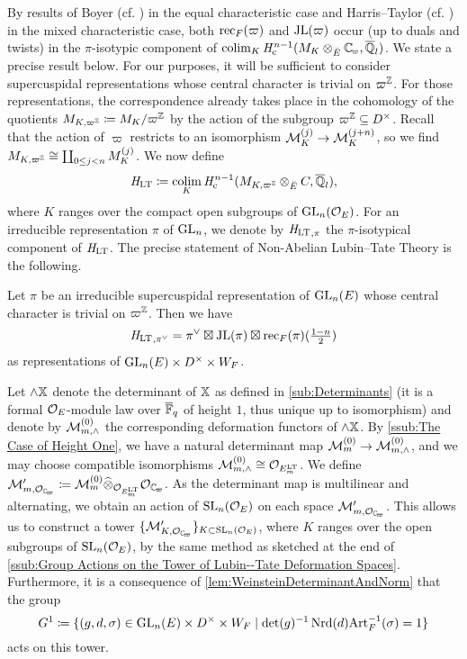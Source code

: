 \documentclass[../main.tex]{subfiles}
\begin{document}
By results of Boyer (cf. \cite{boyer1999mauvaise})
in the equal characteristic case and Harris--Taylor (cf. \cite{HTShimura}) in the 
mixed characteristic case, both $\mathrm{rec}_F(\varpi)$ and $\mathrm{JL}(\varpi)$ occur
(up to duals and twists) in the $\pi$-isotypic component of 
$\colim_K \hHc^{n-1} (M_{K} \otimes_{\br E} \Cp, \bar \Q_l)$. We state a
precise result below.
For our purposes, it will be sufficient to consider supercuspidal representations
whose central character is trivial on $\varpi^{\mathbb{Z}}$. For those representations,
the correspondence already takes place in the cohomology of the 
quotients $M_{K, \varpi^{\mathbb{Z}}} \coloneqq M_K/\varpi^{\mathbb{Z}}$ by the action of the
subgroup $\varpi^{\mathbb{Z}} \subseteq D^\times$. Recall that the action of 
$\varpi$ restricts to an isomorphism $\mathcal{M}_K^{(j)} \to \mathcal{M}_K^{(j+n)}$, so we find
$M_{K, \varpi^{\mathbb{Z}}} \cong \coprod_{0 \leq j < n} M_{K}^{(j)}$. We now define
\begin{equation} \label{eq:defHLT}
  \mathit H_{\mathrm{LT}} \coloneq \operatorname*{colim}_{K} \mathit H_{\mathrm{c}}^{n-1} (M_{K, \varpi^{\mathbb{Z}}} \otimes_{{\breve {E}}} C, \overline {\mathbb{Q}}_l),
\end{equation}
where $K$ ranges over the compact open subgroups of $\operatorname{GL}_n(\mathcal{O}_E)$. 
For an irreducible representation $\pi$ of $\operatorname{GL}_n$, we denote by ${\mathit H_{\mathrm{LT}}}_{,\pi}$ the 
$\pi$-isotypical component of $\mathit H_{\mathrm{LT}}$.
The precise statement of Non-Abelian Lubin--Tate Theory is the following.
\begin{thm}\label{thm:NonAbLTT}
  Let $\pi$ be an irreducible supercuspidal representation of $\operatorname{GL}_n(E)$ whose central
  character is trivial on $\varpi^{\mathbb{Z}}$.   
  Then we have 
  \begin{equation*}
    {\mathit H_{\mathrm{LT}}}_{,\pi^\vee} = \pi^\vee \boxtimes \mathrm{JL}(\pi) \boxtimes \mathrm{rec}_F(\pi)(\tfrac{1-n}2)
  \end{equation*}
  as representations of $\operatorname{GL}_n(E) \times D^\times \times W_F$. 
\end{thm}

Let $\wedge \mathbb{X}$ denote the determinant of $\mathbb{X}$ as defined in 
\cref{sub:Determinants} (it is a formal $\mathcal{O}_E$-module law over
${\overline {\mathbb{F}}_q}$ of height $1$, thus unique up to isomorphism) 
and denote by $\mathcal{M}_{m, \wedge}^{(0)}$ the corresponding deformation functors of
$\wedge \mathbb{X}$. 
By \cref{ssub:The Case of Height One}, we have a natural
determinant map $\mathcal{M}_{m}^{(0)} \to \mathcal{M}_{m ,\wedge}^{(0)}$, and we may choose compatible
isomorphisms $\mathcal{M}_{m, \wedge}^{(0)} \cong \mathcal{O}_{E^{\mathrm{LT}}_m}$. 
We define $\cM'_{m,\cO_\Cp} \coloneq \cM_{m}^{(0)} \cotimes_{\cO_{E^\LT_m}} \cO_\Cp$.
As the determinant map is multilinear and alternating, we obtain an action of 
$\operatorname{SL}_n(\mathcal{O}_E)$ on each space $\cM'_{m,\cO_\Cp}$. This allows us to construct a tower
$\{\cM'_{K, \cO_\Cp}\}_{K \subset \SL_n(\cO_E)}$, where $K$ ranges over the 
open subgroups of $\operatorname{SL}_n(\mathcal{O}_E)$, by the same method as sketched 
at the end of \cref{ssub:Group Actions on the Tower of Lubin--Tate Deformation
Spaces}. Furthermore, it is a consequence of \cref{lem:WeinsteinDeterminantAndNorm}
that the group 
\begin{equation}\label{eq:DefGandG1}
  G^1 \coloneqq \{(g,d,\sigma) \in \operatorname{GL}_n(E) \times D^\times \times W_F \mid 
  \det(g)^{-1} \operatorname{Nrd}(d) \mathrm{Art}_F^{-1}(\sigma) = 1\}
\end{equation}
acts on this tower.
\end{document}
